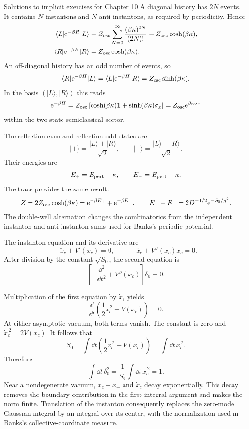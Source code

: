 \begin{bankssolutions}{Solutions to implicit exercises for Chapter 10}
A diagonal history has $2N$ events.  It contains $N$ instantons and $N$
anti-instantons, as required by periodicity.  Hence
\[
\begin{aligned}
  \langle L\rvert \mathrm{e}^{-\beta H}\lvert L\rangle
  &=Z_{\rm osc}\sum_{N=0}^\infty
    \frac{(\beta\kappa)^{2N}}{(2N)!}
    =Z_{\rm osc}\cosh(\beta\kappa),\\
  \langle R\rvert \mathrm{e}^{-\beta H}\lvert R\rangle
  &=Z_{\rm osc}\cosh(\beta\kappa).
\end{aligned}
\]
An off-diagonal history has an odd number of events, so
\[
  \langle R\rvert \mathrm{e}^{-\beta H}\lvert L\rangle
  =\langle L\rvert \mathrm{e}^{-\beta H}\lvert R\rangle
  =Z_{\rm osc}\sinh(\beta\kappa).
\]
In the basis $(\lvert L\rangle,\lvert R\rangle)$ this reads
\[
  \mathrm{e}^{-\beta H}=Z_{\rm osc}
  \left[\cosh(\beta\kappa)\mathbf1
  +\sinh(\beta\kappa)\sigma_x\right]
  =Z_{\rm osc}\mathrm{e}^{\beta\kappa\sigma_x}
\]
within the two-state semiclassical sector.

The reflection-even and reflection-odd states are
\[
  \lvert+\rangle=\frac{\lvert L\rangle+\lvert R\rangle}{\sqrt2},
  \qquad
  \lvert-\rangle=\frac{\lvert L\rangle-\lvert R\rangle}{\sqrt2}.
\]
Their energies are
\[
  E_+=E_{\rm pert}-\kappa,
  \qquad
  E_-=E_{\rm pert}+\kappa.
\]
The trace provides the same result:
\[
  Z=2Z_{\rm osc}\cosh(\beta\kappa)
   =\mathrm{e}^{-\beta E_+}+\mathrm{e}^{-\beta E_-},
  \qquad
  E_--E_+=2D^{-1/2}\mathrm{e}^{-S_0/g^2}.
\]
The double-well alternation changes the combinatorics from the independent
instanton and anti-instanton sums used for Banks's periodic potential.

The instanton equation and its derivative are
\[
  -\ddot x_c+V'(x_c)=0,
  \qquad
  -\dddot x_c+V''(x_c)\dot x_c=0.
\]
After division by the constant $\sqrt{S_0}$, the second equation is
\[
  \left[-\frac{\dd^2}{\dd t^2}+V''(x_c)\right]\delta_0=0.
\]

Multiplication of the first equation by $\dot x_c$ yields
\[
  \frac{\dd}{\dd t}\left(\frac12\dot x_c^{\,2}-V(x_c)\right)=0.
\]
At either asymptotic vacuum, both terms vanish.  The constant is zero and
$\dot x_c^{\,2}=2V(x_c)$.  It follows that
\[
  S_0=\int\dd t\left(\frac12\dot x_c^{\,2}+V(x_c)\right)
  =\int\dd t\,\dot x_c^{\,2}.
\]
Therefore
\[
  \int\dd t\,\delta_0^2
  =\frac1{S_0}\int\dd t\,\dot x_c^{\,2}=1.
\]
Near a nondegenerate vacuum, $x_c-x_\pm$ and $\dot x_c$ decay exponentially.
This decay removes the boundary contribution in the first-integral argument
and makes the norm finite.  Translation of the instanton consequently replaces
the zero-mode Gaussian integral by an integral over its center, with the
normalization used in Banks's collective-coordinate measure.


\end{bankssolutions}
